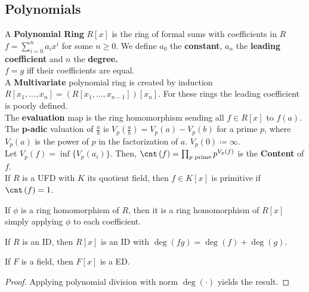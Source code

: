 \subsection{Polynomials}
\begin{definition}
	A \textbf{Polynomial Ring} \(R \left[ x \right] \)  is the ring of formal sums with coefficients in \(R\)  \(f = \sum_{i=0}^{n} a_{i} x^{i}\) for some \(n \ge 0\). We define \(a_0\) the \textbf{constant}, \(a_{n}\) the \textbf{leading coefficient} and \(n\) the \textbf{degree.}\\
	\(f = g\) iff their coefficients are equal.\\
	A \textbf{Multivariate} polynomial ring is created by induction \(R\left[ x_1, \ldots, x_{n} \right] = \left( R\left[ x_1, \ldots, x_{n-1} \right]  \right)\left[ x_{n} \right]   \). For these rings the leading coefficient is poorly defined.\\
	The \textbf{evaluation} map is the ring homomorphism sending all \(f \in R\left[ x \right] \) 	to \(f\left( a \right) \).\\
	The \textbf{p-adic} valuation of \(\frac{a}{b}\)  is \(V_{p}\left( \frac{a}{b} \right)  = V_{p}\left( a \right) - V_{p}\left( b \right) \) for a prime \(p\), where \(V_{p}\left( a \right) \) is the power of \(p\) in the factorization of \(a\). \(V_{p}\left( 0 \right) \coloneqq \infty\).\\
	Let \(V_{p}\left( f \right) = \inf \{ V_{p}\left( a_{i} \right)    \} \). Then, \(\cnt\left( f \right) = \prod_{p \text{ prime}}^{} p^{V_{p}\left( f \right) } \) is the \textbf{Content} of \(f\).\\
	If \(R\) is a UFD with \(K\) its quotient field, then \(f \in K\left[ x \right] \) is primitive if \(\cnt\left( f \right) = 1\).

\end{definition}
\begin{proposition}
	If \(\phi\) is a ring homomorphism of \(R\), then it is a ring homomorphism of \(R\left[ x \right] \) simply applying \(\phi\) to each coefficient.
\end{proposition}
\begin{proposition}
	If \(R\) is an ID, then \(R\left[ x \right] \) is an ID with \(\deg \left( fg \right)  = \deg \left( f \right)  + \deg \left( g \right) \).
\end{proposition}
\begin{theorem}
	If \(F\) is a field, then \(F\left[ x \right] \) is a ED.
\end{theorem}
\begin{proof}
	Applying polynomial division with norm \(\deg \left(  \cdot \right) \) yields the result.
\end{proof}
